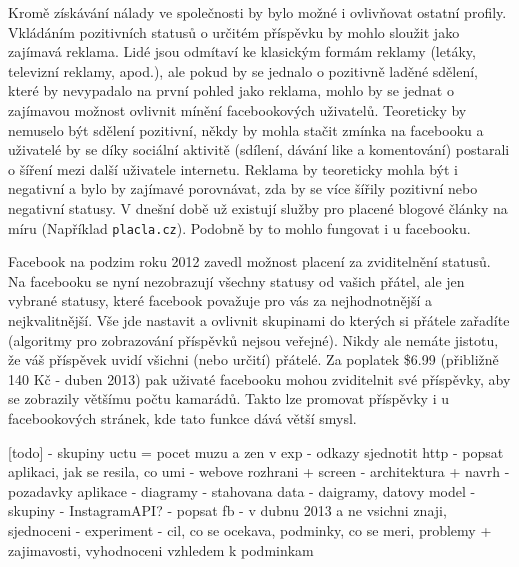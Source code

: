 \documentclass[thesis=M,czech]{FITthesis}[2013/05/10]
\begin{document}
Kromě získávání nálady ve společnosti by bylo možné i ovlivňovat ostatní profily. Vkládáním pozitivních statusů o určitém příspěvku by mohlo sloužit jako zajímavá reklama. Lidé jsou odmítaví ke klasickým formám reklamy (letáky, televizní reklamy, apod.), ale pokud by se jednalo o pozitivně laděné sdělení, které by nevypadalo na první pohled jako reklama, mohlo by se jednat o zajímavou možnost ovlivnit mínění facebookových uživatelů. Teoreticky by nemuselo být sdělení pozitivní, někdy by mohla stačit zmínka na facebooku a uživatelé by se díky sociální aktivitě (sdílení, dávání like a komentování) postarali o šíření mezi další uživatele internetu. Reklama by teoreticky mohla být i negativní a bylo by zajímavé porovnávat, zda by se více šířily pozitivní nebo negativní statusy. V dnešní době už existují služby pro placené blogové články na míru (Například \verb|placla.cz|). Podobně by to mohlo fungovat i u facebooku.

Facebook na podzim roku 2012 zavedl možnost placení za zviditelnění statusů. Na facebooku se nyní nezobrazují všechny statusy od vašich přátel, ale jen vybrané statusy, které facebook považuje pro vás za nejhodnotnější a nejkvalitnější. Vše jde nastavit a ovlivnit skupinami do kterých si přátele zařadíte (algoritmy pro zobrazování příspěvků nejsou veřejné). Nikdy ale nemáte jistotu, že váš příspěvek uvidí všichni (nebo určití) přátelé. Za poplatek \$6.99 (přibližně 140 Kč - duben 2013) pak uživaté facebooku mohou zviditelnit své příspěvky, aby se zobrazily většímu počtu kamarádů. Takto lze promovat příspěvky i u facebookových stránek, kde tato funkce dává větší smysl.


[todo] - skupiny uctu
= pocet muzu a zen v exp
- odkazy sjednotit http
- popsat aplikaci, jak se resila, co umi
- webove rozhrani + screen
- architektura + navrh
- pozadavky aplikace
- diagramy
- stahovana data - daigramy, datovy model
- skupiny
- InstagramAPI?
- popsat fb - v dubnu 2013 a ne vsichni znaji, sjednoceni
- experiment
 - cil, co se ocekava, podminky, co se meri, problemy + zajimavosti, vyhodnoceni vzhledem k podminkam




\appendix
\end{document}
